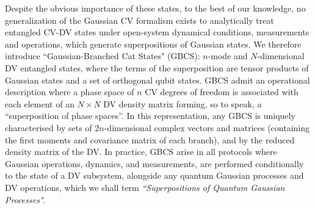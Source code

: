 \documentclass[%
reprint,
superscriptaddress,
nofootinbib,
 amsmath,amssymb,
prx,
floatfix,
]{revtex4-2}
\begin{document}
Despite the obvious importance of these states, to the best of our knowledge, no generalization of the Gaussian CV formalism exists to analytically treat entangled CV-DV states under open-system dynamical conditions, measurements and operations, which generate superpositions of Gaussian states.
We therefore introduce ``Gaussian-Branched Cat States" (GBCS): $n$-mode and $N$-dimensional DV entangled states, where the terms of the superposition are tensor products of Gaussian states and a set of orthogonal qubit states. GBCS admit an operational description where a phase space of $n$ CV degrees of freedom is associated with each element of an $N\times N$ DV density matrix forming, so to speak, a ``superposition of phase spaces''. In this representation, any GBCS is uniquely characterised by sets of $2n$-dimensional complex vectors and matrices (containing the first moments and covariance matrix of each branch), and by the reduced density matrix of the DV. In practice, GBCS arise in all protocols where Gaussian operations, dynamics, and measurements, are performed conditionally to the state of a DV subsystem, alongside any quantum Gaussian processes and DV operations, which we shall term \textit{``Superpositions of Quantum Gaussian Processes"}. 

\end{document}
